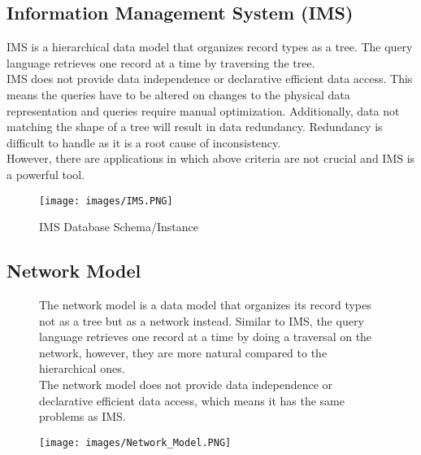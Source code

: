 \subsection{Information Management System (IMS)}
IMS is a hierarchical data model that organizes record types as a tree. The query language retrieves one record at a time by traversing the tree. \\
IMS does not provide data independence or declarative efficient data access. This means the queries have to be altered on changes to the physical data representation and queries require manual optimization. Additionally, data not matching the shape of a tree will result in data redundancy. Redundancy is difficult to handle as it is a root cause of inconsistency.\\
However, there are applications in which above criteria are not crucial and IMS is a powerful tool.
\begin{figure}[H]
\centering
\texttt{[image: images/IMS.PNG]}
\label{IMS_instance}
\caption{IMS Database Schema/Instance}
\end{figure}

\subsection{Network Model}
\begin{figure}[H]
\begin{minipage}[t]{.5\textwidth}
The network model is a data model that organizes its record types not as a tree but as a network instead. Similar to IMS, the query language retrieves one record at a time by doing a traversal on the network, however, they are more natural compared to the hierarchical ones. \\
The network model does not provide data independence or declarative efficient data access, which means it has the same problems as IMS.
\end{minipage}
\begin{minipage}[t]{.5\textwidth}
\strut\vspace*{-\baselineskip}\newline
\centering
\texttt{[image: images/Network\_Model.PNG]}
\label{Network_Model_instance}
\end{minipage}
\end{figure}

